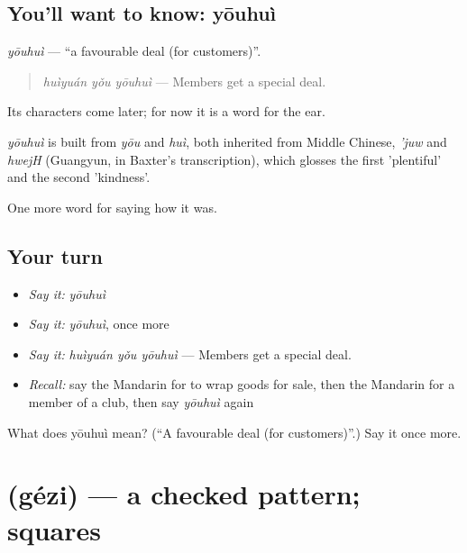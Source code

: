 \subsection*{You'll want to know: yōuhuì}
\emph{yōuhuì} — \textquotedblleft{}a favourable deal (for customers)\textquotedblright{}.

\begin{quote}
\emph{huìyuán yǒu yōuhuì} — Members get a special deal.
\end{quote}

Its characters come later; for now it is a word for the ear.

\begin{cousinweb}
\emph{yōuhuì} is built from \emph{yōu} and \emph{huì}, both inherited from Middle Chinese, \emph{'juw} and \emph{hwejH} (Guangyun, in Baxter's transcription), which glosses the first 'plentiful' and the second 'kindness'.
\end{cousinweb}

\begin{grammarlens}[title={What you've built}]
One more word for saying how it was.
\end{grammarlens}

\subsection*{Your turn}
\begin{itemize}
\raggedright
  \item \emph{Say it:} \emph{yōuhuì}
  \item \emph{Say it:} \emph{yōuhuì}, once more
  \item \emph{Say it:} \emph{huìyuán yǒu yōuhuì} — Members get a special deal.
  \item \emph{Recall:} say the Mandarin for to wrap goods for sale, then the Mandarin for a member of a club, then say \emph{yōuhuì} again
\end{itemize}

\begin{tcolorbox}[breakable,colback=teal!4,colframe=teal!35!black,title={Before you move on}]
What does yōuhuì mean? (\textquotedblleft{}A favourable deal (for customers)\textquotedblright{}.) Say it once more.
\end{tcolorbox}
\section[\texorpdfstring{\zh{格子} (gézi)}{格子 (gézi)}]{ (gézi) — a checked pattern; squares}

